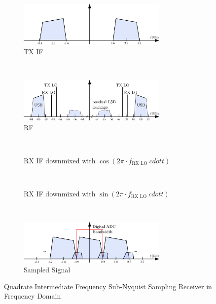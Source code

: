 \begin{figure}[h!]
  \centering
  \begin{subfigure}{\textwidth}
    \centering
    \includegraphics[width=0.8\textwidth]{figures/rx_2_freq_tx_if}
    \caption{\gls{TX} \gls{IF}}
    \label{fig:rx_2_frq_tx_if}
  \end{subfigure}
  \vspace{4ex} \\
  \begin{subfigure}{\textwidth}
    \centering
    \includegraphics[width=0.8\textwidth]{figures/rx_2_freq_rf}
    \caption{\gls{RF}}
    \label{fig:rx_2_freq_rf}
  \end{subfigure}
  \vspace{4ex} \\
  \begin{subfigure}{\textwidth}
    \centering
    \caption{\gls{RX} \gls{IF} downmixed with $\cos(2\pi \cdot f_{\text{RX LO}} \ cdot t)$}
    \label{fig:rx_2_freq_rx_if1_cos}
  \end{subfigure}
  ~
  \begin{subfigure}{\textwidth}
    \centering
    \caption{\gls{RX} \gls{IF} downmixed with $\sin(2\pi \cdot f_{\text{RX LO}} \ cdot t)$}
    \label{fig:rx_2_freq_rx_if1_sin}
  \end{subfigure}
  \vspace{4ex} \\
  \begin{subfigure}{\textwidth}
    \centering
    \includegraphics[width=0.8\textwidth]{figures/rx_2_freq_rx_adc}
    \caption{Sampled Signal}
    \label{fig:rx_2_freq_rx_if2}
  \end{subfigure}
  \caption{Quadrate Intermediate Frequency Sub-Nyquist Sampling Receiver
    in Frequency Domain}
  \label{fig:rx_2_freq}
\end{figure}
